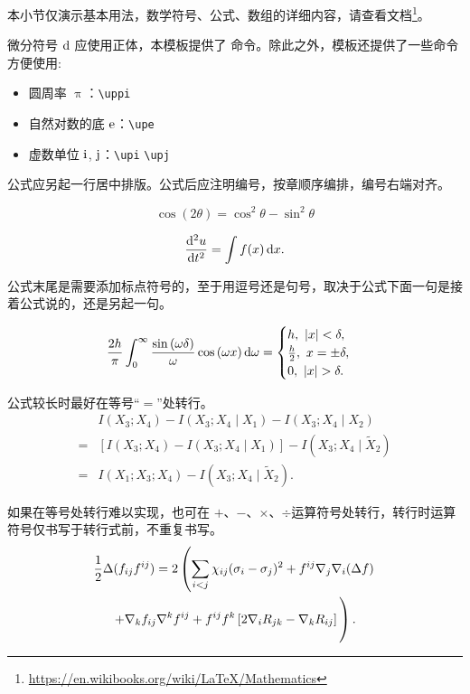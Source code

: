 本小节仅演示基本用法，数学符号、公式、数组的详细内容，请查看文档\footnote{\url{https://en.wikibooks.org/wiki/LaTeX/Mathematics}}。

微分符号 $\mathop{}\!\mathrm{d}$ 应使用正体，本模板提供了  命令。除此之外，模板还提供了一些命令方便使用:
\begin{itemize}
  \item 圆周率 $\uppi$：\verb|\uppi|
  \item 自然对数的底 $\mathrm{e}$：\verb|\upe|
  \item 虚数单位 $\mathrm{i}$, $\mathrm{j}$：\verb|\upi| \verb|\upj|
\end{itemize}

公式应另起一行居中排版。公式后应注明编号，按章顺序编排，编号右端对齐。

\begin{equation}
	\cos (2\theta) = \cos^2 \theta - \sin^2 \theta
\end{equation}

\begin{equation}
  \frac{\mathop{}\!\mathrm{d}^2 u}{\mathop{}\!\mathrm{d} t^2} = \int f(x) \mathop{}\!\mathrm{d} x.
\end{equation}

公式末尾是需要添加标点符号的，至于用逗号还是句号，取决于公式下面一句是接着公式说的，还是另起一句。

\begin{equation}
	\frac{2h}{\pi}\int_{0}^{\infty}\frac{\sin\left( \omega\delta \right)}{\omega}
	\cos\left( \omega x \right) \mathop{}\!\mathrm{d}\omega = 
	\begin{cases}
		h, \ \left| x \right| < \delta, \\
		\frac{h}{2}, \ x = \pm \delta, \\
		0, \ \left| x \right| > \delta.
	\end{cases}
\end{equation}

公式较长时最好在等号“$=$”处转行。
\begin{align}
    & I (X_3; X_4) - I (X_3; X_4 \mid X_1) - I (X_3; X_4 \mid X_2) \nonumber \\
  = & [I (X_3; X_4) - I (X_3; X_4 \mid X_1)] - I (X_3; X_4 \mid \tilde{X}_2) \\
  = & I (X_1; X_3; X_4) - I (X_3; X_4 \mid \tilde{X}_2).
\end{align}

如果在等号处转行难以实现，也可在 $+$、$-$、$\times$、$\div$运算符号处转行，转行时运算符号仅书写于转行式前，不重复书写。
\begin{multline}
  \frac{1}{2} \Delta (f_{ij} f^{ij}) =
    2 \left(\sum_{i<j} \chi_{ij}(\sigma_{i} - \sigma_{j})^{2}
    + f^{ij} \nabla_{j} \nabla_{i} (\Delta f) \right. \\
  \left. + \nabla_{k} f_{ij} \nabla^{k} f^{ij} +
    f^{ij} f^{k} \left[2\nabla_{i}R_{jk}
    - \nabla_{k} R_{ij} \right] \vphantom{\sum_{i<j}} \right).
\end{multline}


